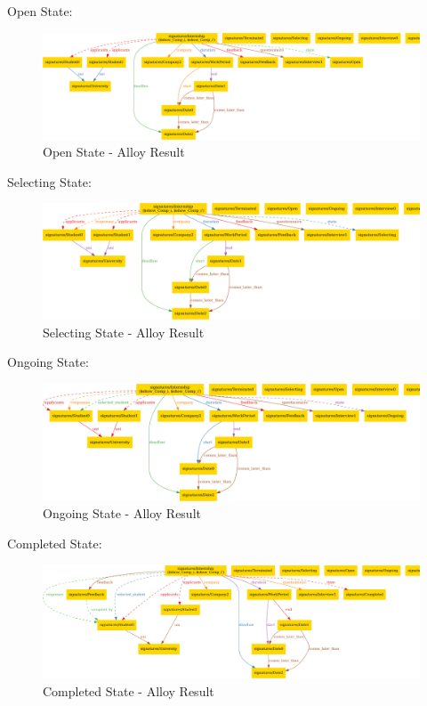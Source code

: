 \par Open State:
\begin{figure}[H]
    \centering
    \includegraphics[width=1\textwidth,height=0.3\textheight]{Images/Alloy_images/Alloy_1-2.pdf}
    \caption{Open State - Alloy Result}
\end{figure}

\par Selecting State:
\begin{figure}[H]
    \centering
    \includegraphics[width=1\textwidth,height=0.3\textheight]{Images/Alloy_images/Alloy_1-3.pdf}
    \caption{Selecting State - Alloy Result}
\end{figure}

\par Ongoing State:
\begin{figure}[H]
    \centering
    \includegraphics[width=1\textwidth,height=0.3\textheight]{Images/Alloy_images/Alloy_1-4.pdf}
    \caption{Ongoing State - Alloy Result}
\end{figure}

\par Completed State:
\begin{figure}[H]
    \centering
    \includegraphics[width=1\textwidth,height=0.3\textheight]{Images/Alloy_images/Alloy_1-5.pdf}
    \caption{Completed State - Alloy Result}
\end{figure}
